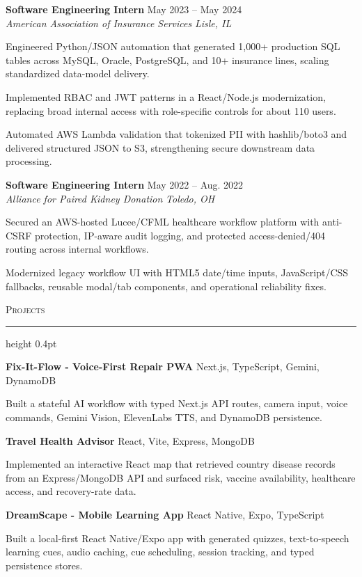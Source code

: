 \documentclass[letterpaper,11pt]{article}
\newcommand{\resumesection}[1]{%
  \par\vspace{2pt}%
  {\large\scshape #1}\par\vspace{2pt}%
  \hrule height 0.4pt\vspace{2pt}%
}
\newcommand{\resumeSubheading}[4]{
  \textbf{#1} \hfill #2\\
  \textit{#3} \hfill \textit{#4}
}
\newcommand{\projectHeading}[2]{
  \textbf{#1} \hfill #2
}
\begin{document}
\resumeSubheading
{Software Engineering Intern}{May 2023 -- May 2024}
{American Association of Insurance Services}{Lisle, IL}
\begin{tightitemize}
  \item Engineered Python/JSON automation that generated 1,000+ production SQL tables across MySQL, Oracle, PostgreSQL, and 10+ insurance lines, scaling standardized data-model delivery.
  \item Implemented RBAC and JWT patterns in a React/Node.js modernization, replacing broad internal access with role-specific controls for about 110 users.
  \item Automated AWS Lambda validation that tokenized PII with hashlib/boto3 and delivered structured JSON to S3, strengthening secure downstream data processing.
\end{tightitemize}

\resumeSubheading
{Software Engineering Intern}{May 2022 -- Aug. 2022}
{Alliance for Paired Kidney Donation}{Toledo, OH}
\begin{tightitemize}
  \item Secured an AWS-hosted Lucee/CFML healthcare workflow platform with anti-CSRF protection, IP-aware audit logging, and protected access-denied/404 routing across internal workflows.
  \item Modernized legacy workflow UI with HTML5 date/time inputs, JavaScript/CSS fallbacks, reusable modal/tab components, and operational reliability fixes.
\end{tightitemize}

\resumesection{Projects}
\projectHeading{Fix-It-Flow - Voice-First Repair PWA}{Next.js, TypeScript, Gemini, DynamoDB}
\begin{tightitemize}
  \item Built a stateful AI workflow with typed Next.js API routes, camera input, voice commands, Gemini Vision, ElevenLabs TTS, and DynamoDB persistence.
\end{tightitemize}

\projectHeading{Travel Health Advisor}{React, Vite, Express, MongoDB}
\begin{tightitemize}
  \item Implemented an interactive React map that retrieved country disease records from an Express/MongoDB API and surfaced risk, vaccine availability, healthcare access, and recovery-rate data.
\end{tightitemize}

\projectHeading{DreamScape - Mobile Learning App}{React Native, Expo, TypeScript}
\begin{tightitemize}
  \item Built a local-first React Native/Expo app with generated quizzes, text-to-speech learning cues, audio caching, cue scheduling, session tracking, and typed persistence stores.
\end{tightitemize}
\end{document}
